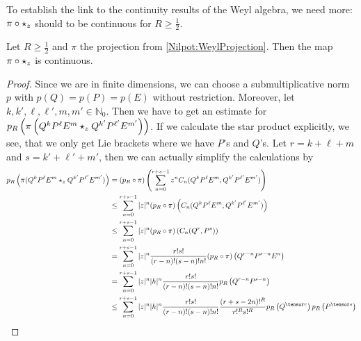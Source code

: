 To establish the link to the continuity results of the Weyl algebra,
we need more: $\pi \circ \star_z$ should to be continuous for $R \geq \frac 
1 2$.
\begin{proposition}
    \label{proposition:ContinuousProductInWeyl}%
    Let $R \geq \frac{1}{2}$ and $\pi$ the projection from
    \eqref{Nilpot:WeylProjection}. Then the map $\pi \circ
    \star_z$ is continuous.
\end{proposition}
\begin{proof}
    Since we are in finite dimensions, we can choose a
    submultiplicative norm $p$ with $p(Q) = p(P) = p(E)$ without
    restriction. Moreover, let $k, k', \ell, \ell', m, m' \in
    \mathbb{N}_0$. Then we have to get an estimate for $p_R \left(
        \pi\left( Q^k P^{\ell} E^m \star_z Q^{k'} P^{\ell'} E^{m'}
        \right) \right)$.  If we calculate the star product
    explicitly, we see, that we only get Lie brackets where we have
    $P$'s and $Q$'s. Let $r = k + \ell + m$ and $s = k' + \ell' + m'$,
    then we can actually simplify the calculations by
    \begin{align*}
        p_R \left(
        \pi(Q^k P^{\ell} E^m
        \ostar_z    Q^{k'} P^{\ell'} E^{m'}
        ) \right)
        & =
        (p_R \circ \pi) \left(
        \sum\limits_{n=0}^{r + s - 1}
        z^n C_n(Q^k P^{\ell} E^m,
        Q^{k'} P^{\ell'} E^{m'})
        \right)
        \\
        & \leq
        \sum\limits_{n=0}^{r + s - 1}
        |z|^n
        (p_R \circ \pi) \left(
        C_n(Q^k P^{\ell} E^m,
        Q^{k'} P^{\ell'} E^{m'})
        \right)
        \\
        & \leq
        \sum\limits_{n=0}^{r + s - 1}
        |z|^n
        (p_R \circ \pi) \left(
        C_n(Q^r, P^s)
        \right)
        \\
        & =
        \sum\limits_{n=0}^{r + s - 1}
        |z|^n
        \frac{r! s!}{(r-n)! (s-n)! n!}
        (p_R \circ \pi) \left(
        Q^{r-n} P^{s-n} E^n
        \right)
        \\
        & =
        \sum\limits_{n=0}^{r + s - 1}
        |z|^n |h|^n
        \frac{r! s!}{(r-n)! (s-n)! n!}
        p_R \left(
        Q^{r-n} P^{s-n}
        \right)
        \\
        & \leq
        \sum\limits_{n=0}^{r + s - 1}
        |z|^n |h|^n
        \frac{r! s!}{(r-n)! (s-n)! n!}
        \frac{(r + s - 2n)!^R}{r!^R s!^R}
        p_R \left(Q^{\tensor r} \right)
        p_R \left(P^{\tensor s} \right)
        \\

\end{align*}
\end{proof}
